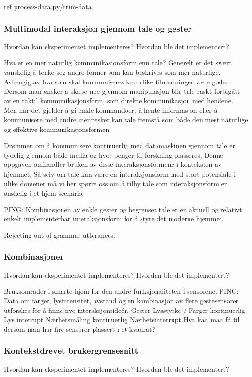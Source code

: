 {\color{red} ref process-data.py/trim-data}


\subsubsection{Multimodal interaksjon gjennom tale og gester}
{\color{red} Hvordan kan eksperimentet implementeres? Hvordan ble det implementert?}

Hva er en mer naturlig kommunikasjonsform enn tale? Generelt er det svært vanskelig å tenke seg andre former som kan beskrives som mer naturlige. Avhengig av hva som skal kommuniseres kan ulike tilnærminger være gode. Dersom man ønsker å skape noe gjennom manipulasjon blir tale raskt forbigått av en taktil kommunikasjonsform, som direkte kommunikasjon med hendene. Men når det gjelder å gi enkle kommandoer, å hente informasjon eller å kommunisere med andre mennesker kan tale fremstå som både den mest naturlige og effektive kommunikasjonsformen.

Drømmen om å kommunisere kontinuerlig med datamaskinen gjennom tale er tydelig gjennom både media og hvor penger til forskning plasseres. Denne oppgaven omhandler bruken av disse interaksjonsformene i konteksten av hjemmet. Så selv om tale kan være en interaksjonsform med stort potensiale i ulike domener må vi her spørre oss om å tilby tale som interaksjonsform er ønskelig i et hjem-scenario. 

{\color{red}PING: Kombinasjonen av enkle gester og begrenset tale er en aktuell og relativt enkelt implementerbar interaksjonsform for å styre det moderne hjemmet.}

Rejecting out of grammar utterances.


\subsubsection{Kombinasjoner}
{\color{red}Hvordan kan eksperimentet implementeres? Hvordan ble det implementert?}

Bruksområder i smarte hjem for den andre funksjonaliteten i sensorene.
PING: Data om farger, lysintensitet, avstand og en kombinasjon av flere gestesensorer utforskes for å finne nye interaksjonsideér.
Gester
Lysstyrke / Farger kontinuerlig
Lys interrupt
Nærhetsmåling kontinuerlig
Nærhetsinterrupt
Hva kan man få til dersom man har fire sensorer plassert i et kvadrat?

\subsubsection{Kontekstdrevet brukergrensesnitt}
{\color{red}Hvordan kan eksperimentet implementeres? Hvordan ble det implementert?}

